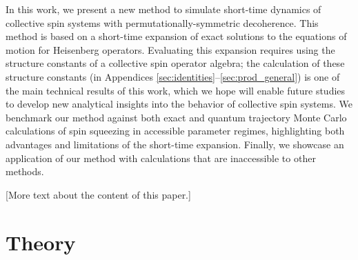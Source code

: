 \documentclass[pra,reprint,longbibliography]{revtex4-1}
\newcommand{\1}{\mathds{1}}
\begin{document}
In this work, we present a new method to simulate short-time dynamics
of collective spin systems with permutationally-symmetric decoherence.
This method is based on a short-time expansion of exact solutions to
the equations of motion for Heisenberg operators.  Evaluating this
expansion requires using the structure constants of a collective spin
operator algebra; the calculation of these structure constants (in
Appendices \ref{sec:identities}--\ref{sec:prod_general}) is one of the
main technical results of this work, which we hope will enable future
studies to develop new analytical insights into the behavior of
collective spin systems.  We benchmark our method against both exact
and quantum trajectory Monte Carlo calculations of spin squeezing in
accessible parameter regimes, highlighting both advantages and
limitations of the short-time expansion.  Finally, we showcase an
application of our method with calculations that are inaccessible to
other methods.

[More text about the content of this paper.]


\section{Theory}
\end{document}
